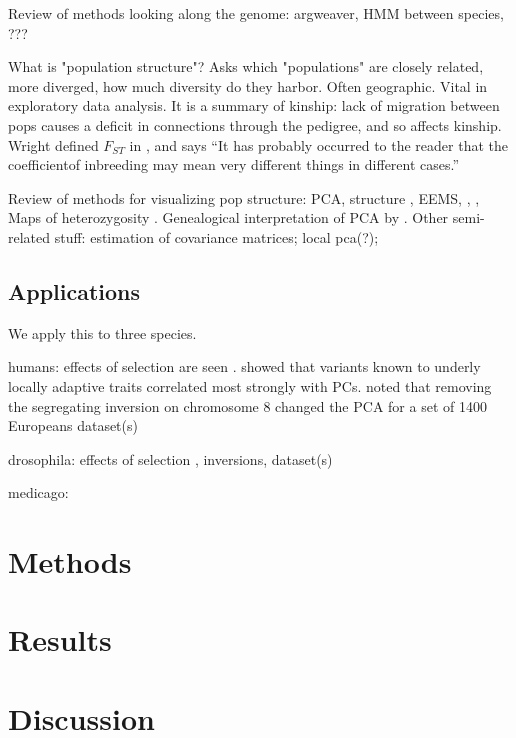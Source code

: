 \documentclass{article}
\begin{document}
Review of methods looking along the genome:
argweaver, HMM between species, ???

What is "population structure"?
Asks which "populations" are closely related, more diverged, how much diversity do they harbor.
Often geographic.
Vital in exploratory data analysis.
It is a summary of kinship: 
lack of migration between pops causes a deficit in connections through the pedigree,
and so affects kinship.
Wright defined $F_{ST}$ in \citep{wright1949genetical}, and says ``It has probably occurred to the reader that the coefficientof inbreeding may mean very different
things in different cases.''

Review of methods for visualizing pop structure:
PCA, structure \citep{falush2003inference}, EEMS, \citep{petkova2014visualizing}, \citep{yang2012modelbased},
Maps of heterozygosity \citep{ramachandran2005support}.
Genealogical interpretation of PCA by \citet{mcvean2009genealogical}.
Other semi-related stuff:
estimation of covariance matrices;
local pca(?);

\subsection{Applications}

We apply this to three species.

humans:
effects of selection are seen \citep{sabeti2006positive}.
\citet{duforetfrebourg2015detecting} showed that variants known to underly locally adaptive traits correlated most strongly with PCs.
\citet{tian2008analysis} noted that removing the segregating inversion on chromosome 8 changed the PCA for a set of 1400 Europeans
dataset(s)

drosophila:
effects of selection \citep{sella2009pervasive},
inversions,
dataset(s)

medicago:


\section{Methods}


\section{Results}


\section{Discussion}


\end{document}
